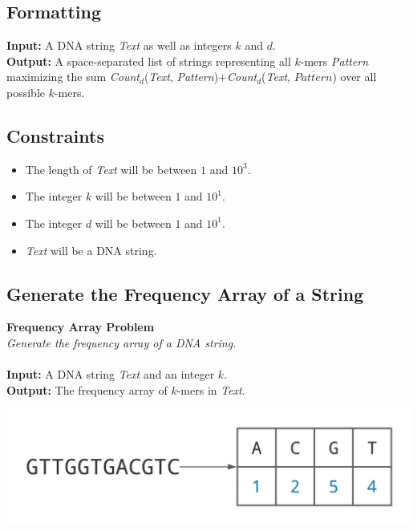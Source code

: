 \documentclass{article}
\begin{document}
\subsection*{Formatting}
\textbf{Input:} A DNA string \emph{Text} as well as integers $k$ and $d$.\\
\noindent \textbf{Output:} A space-separated list of strings representing all $k$-mers \emph{Pattern} maximizing the sum \emph{Count}$_d$(\emph{Text}, \emph{Pattern})$+$\emph{Count}$_d$(\emph{Text}, $\overline{Pattern}$) over all possible $k$-mers.

\subsection*{Constraints}
\begin{itemize}
    \item The length of \emph{Text} will be between $1$ and $10^3$.
    \item The integer $k$ will be between $1$ and $10^1$.
    \item The integer $d$ will be between $1$ and $10^1$.
    \item \emph{Text} will be a DNA string.
\end{itemize}
\pagebreak
\subsection{Generate the Frequency Array of a String}
\hline\vspace{5}
\noindent \textbf{Frequency Array Problem}\\
\emph{Generate the frequency array of a DNA string}.\\ \\
\textbf{Input:} A DNA string \emph{Text} and an integer $k$.\\
\textbf{Output:} The frequency array of $k$-mers in \emph{Text}.
\begin{center}
    \includegraphics[scale=0.2]{c1/logos/1K.png} 
\end{center}
\hline\vspace{5}
\end{document}
